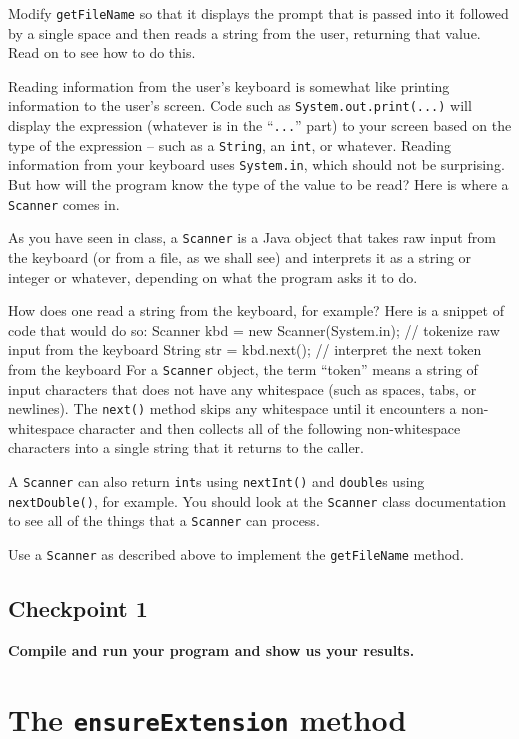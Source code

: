 \documentclass[12pt]{article}
\newenvironment{qv}%
  {\quote
   \verbatim}%
  {\endverbatim
   \endquote}
\newcommand{\code}{\texttt}
\begin{document}
Modify \code{getFileName} so that it displays the prompt
that is passed into it followed by a single space and then reads a
string from the user, returning that value.
Read on to see how to do this.

Reading information from the user's keyboard
is somewhat like printing information to the user's screen.
Code such as \verb'System.out.print(...)' will display
the expression (whatever is in the ``\verb:...:'' part) to your screen
based on the type of the expression --
such as a \verb'String', an \verb'int', or whatever.
Reading information from your keyboard uses \verb'System.in',
which should not be surprising.
But how will the program know the type of the value to be read?
Here is where a \verb'Scanner' comes in.

As you have seen in class,
a \verb'Scanner' is a Java object that takes raw input
from the keyboard (or from a file, as we shall see)
and interprets it as a string or integer or whatever,
depending on what the program asks it to do.

How does one read a string from the keyboard, for example?
Here is a snippet of code that would do so:
\begin{qv}
Scanner kbd = new Scanner(System.in); // tokenize raw input from the keyboard
String str = kbd.next(); // interpret the next token from the keyboard
\end{qv}
For a \verb'Scanner' object, the term ``token'' means
a string of input characters that does not have any whitespace
(such as spaces, tabs, or newlines).
The \verb'next()' method skips any whitespace
until it encounters a non-whitespace character
and then collects all of the following non-whitespace characters
into a single string that it returns to the caller.

A \verb'Scanner' can also return \verb'int's using \verb'nextInt()'
and \verb'double's using \verb'nextDouble()', for example.
You should look at the \verb'Scanner' class documentation to see
all of the things that a \verb'Scanner' can process.

Use a \verb'Scanner' as described above
to implement the \verb'getFileName' method.

\subsection*{Checkpoint 1}
{\bf
Compile and run your program and show us your results.
}

\section*{The {\tt ensureExtension} method}
\end{document}
